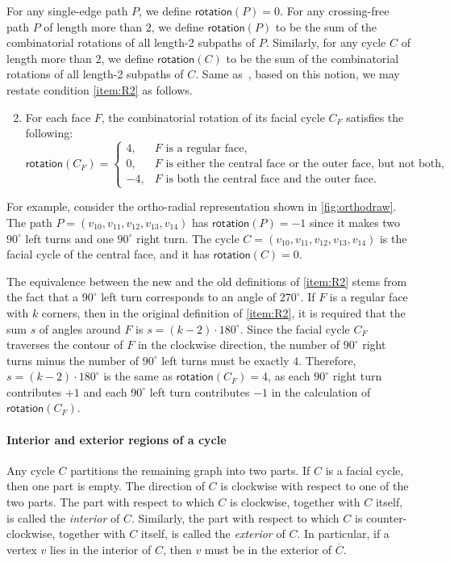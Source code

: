\documentclass{article}\usepackage[a4paper,margin=20mm]{geometry}
\newcommand{\rotation}{\mathsf{rotation}}
\begin{document}
For any single-edge path $P$, we define $\rotation(P) = 0$.
For any crossing-free path $P$ of length more than $2$, we define $\rotation(P)$ to be the sum of the combinatorial rotations of all length-2 subpaths of $P$. Similarly, for any cycle $C$ of length more than $2$, we define $\rotation(C)$ to be the sum of the combinatorial rotations of all length-2 subpaths of $C$.  Same as~\cite{barth2023topology}, based on this notion, we may restate condition \ref{item:R2} as follows.

\begin{enumerate}[(R1$'$)]\setcounter{enumi}{1}
    \item For each face $F$, the combinatorial rotation of its facial cycle $C_F$ satisfies the following:
\[\rotation(C_F)=\begin{cases}
			4, & \text{$F$ is a regular face,}\\
            0, & \text{$F$ is either the central face or the outer face, but not both,}\\
            -4, & \text{$F$ is both the central face and the outer face.}
		 \end{cases}\]
\end{enumerate}

For example, consider the ortho-radial representation shown in \cref{fig:orthodraw}. The path $P=(v_{10}, v_{11}, v_{12}, v_{13}, v_{14})$  has $\rotation(P) = -1$ since it makes two $90^\circ$  left turns and one $90^\circ$ right turn. The cycle $C=(v_{10}, v_{11}, v_{12}, v_{13}, v_{14})$ is the facial cycle of the central face, and it has $\rotation(C) = 0$.

The equivalence between the new and the old definitions of \ref{item:R2} stems from the fact that a $90^\circ$ left turn corresponds to an angle of $270^\circ$.
If $F$ is a regular face with $k$ corners, then in the original definition of \ref{item:R2}, it is required that the sum $s$ of angles around $F$ is $s = (k-2)\cdot 180^\circ$. Since the facial cycle $C_F$ traverses the contour of $F$ in the clockwise direction, the number of $90^\circ$ right turns minus the number of $90^\circ$ left turns must be exactly $4$. Therefore, $s = (k-2)\cdot 180^\circ$ is the same as $\rotation(C_F) = 4$, as each $90^\circ$ right turn contributes $+1$ and each $90^\circ$ left turn contributes $-1$ in the calculation of $\rotation(C_F)$.  

\paragraph{Interior and exterior regions of a cycle}
Any cycle $C$ partitions the remaining graph into two parts. If $C$ is a facial cycle, then one part is empty. The direction of $C$ is clockwise with respect to one of the two parts. The part with respect to which $C$ is clockwise, together with $C$ itself, is called the \emph{interior} of $C$. Similarly, the part with respect to which $C$ is counter-clockwise, together with $C$ itself, is called the \emph{exterior} of $C$. In particular, if a vertex $v$ lies in the interior of $C$, then $v$ must be in the exterior of $\overline{C}$. 
\end{document}
